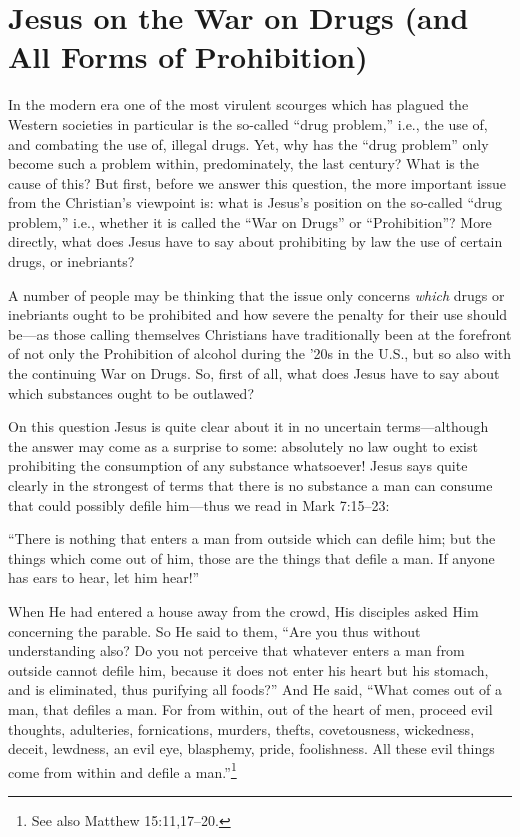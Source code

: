 \documentclass[letterpaper,12pt]{article}
\newenvironment{squotation}
  {\small\quotation}
  {\endquotation\normalsize}
\begin{document}
\section{Jesus on the War on Drugs (and All Forms of Prohibition)}
\label{sec:JesusOnTheWarOnDrugsAndAllFormsOfProhibition}

In the modern era one of the most virulent scourges which has plagued the Western societies in particular is the so-called ``drug problem,'' i.e., the use of, and combating the use of, illegal drugs. Yet, why has the ``drug problem'' only become such a problem within, predominately, the last century? What is the cause of this? But first, before we answer this question, the more important issue from the Christian's viewpoint is: what is Jesus's position on the so-called ``drug problem,'' i.e., whether it is called the ``War on Drugs'' or ``Prohibition''? More directly, what does Jesus have to say about prohibiting by law the use of certain drugs, or inebriants?

A number of people may be thinking that the issue only concerns \emph{which} drugs or inebriants ought to be prohibited and how severe the penalty for their use should be---as those calling themselves Christians have traditionally been at the forefront of not only the Prohibition of alcohol during the '20s in the U.S., but so also with the continuing War on Drugs. So, first of all, what does Jesus have to say about which substances ought to be outlawed?

On this question Jesus is quite clear about it in no uncertain terms---although the answer may come as a surprise to some: absolutely no law ought to exist prohibiting the consumption of any substance whatsoever! Jesus says quite clearly in the strongest of terms that there is no substance a man can consume that could possibly defile him---thus we read in Mark 7:15--23:

\begin{squotation}
``There is nothing that enters a man from outside which can defile him; but the things which come out of him, those are the things that defile a man. If anyone has ears to hear, let him hear!''

When He had entered a house away from the crowd, His disciples asked Him concerning the parable. So He said to them, ``Are you thus without understanding also? Do you not perceive that whatever enters a man from outside cannot defile him, because it does not enter his heart but his stomach, and is eliminated, thus purifying all foods?'' And He said, ``What comes out of a man, that defiles a man. For from within, out of the heart of men, proceed evil thoughts, adulteries, fornications, murders, thefts, covetousness, wickedness, deceit, lewdness, an evil eye, blasphemy, pride, foolishness. All these evil things come from within and defile a man.''\footnote{See also Matthew 15:11,17--20.}
\end{squotation}
\end{document}
